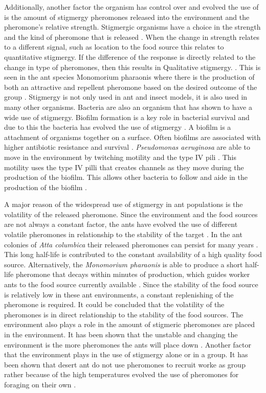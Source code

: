 Additionally, another factor the organism has control over and evolved the use of is the amount of stigmergy pheromones released into the environment and the pheromone’s relative strength.
Stigmergic organisms have a choice in the strength and the kind of pheromone that is released \cite{dorigo_ant_2000}.
When the change in strength relates to a different signal, such as location to the food source this relates to quantitative stigmergy.
If the difference of the response is directly related to the change in type of pheromones, then this results in Qualitative stigmergy.
\cite{heylighen_stigmergy_2016b}.
This is seen in the ant species Monomorium pharaonis where there is the production of both an attractive and repellent pheromone based on the desired outcome of the group \cite{jeanson_pheromone_2003}.
Stigmergy is not only used in ant and insect models, it is also used in many other organisms.
Bacteria are also an organism that has shown to have a wide use of stigmergy.
Biofilm formation is a key role in bacterial survival and due to this the bacteria has evolved the use of stigmergy \cite{gloag_bacterial_2015}.
A biofilm is a attachment of organisms together on a surface.
Often biofilms are associated with higher antibiotic resistance and survival \cite{donlan2002biofilms}.
\textit{Pseudomonas aeruginosa} are able to move in the environment by twitching motility and the type IV pili \cite{persat2015type}.
This motility uses the type IV pilli that creates channels as they move during the production of the biofilm.
This allows other bacteria to follow and aide in the production of the biofilm \cite{gloag_stigmergy:_2013}.

A major reason of the widespread use of stigmergy in ant populations is the volatility of the released pheromone.
Since the environment and the food sources are not always a constant factor, the ants have evolved the use of different volatile pheromones in relationship to the stability of the target \cite{jeanson_pheromone_2003}.
In the ant colonies of \textit{Atta columbica} their released pheromones can persist for many years \cite{howard_costs_2001}.
This long half-life is contributed to the constant availability of a high quality food source.
Alternatively, the \textit{Monomorium pharaonis} is able to produce a short half-life pheromone that decays within minutes of production, which guides worker ants to the food source currently available \cite{robinson_decay_2008}.
Since the stability of the food source is relatively low in these ant environments, a constant replenishing of the pheromone is required.
It could be concluded that the volatility of the pheromones is in direct relationship to the stability of the food sources.
The environment also plays a role in the amount of stigmeric pheromones are placed in the environment.
It has been shown that the unstable and changing the environment is the more pheromones the ants will place down \cite{czaczkes2015trail}.
Another factor that the environment plays in the use of stigmergy alone or in a group.
It has been shown that desert ant do not use pheromones to recruit worke as group rather because of the high temperatures evolved the use of pheromones for foraging on their own \cite{ruano_high_2000}.

